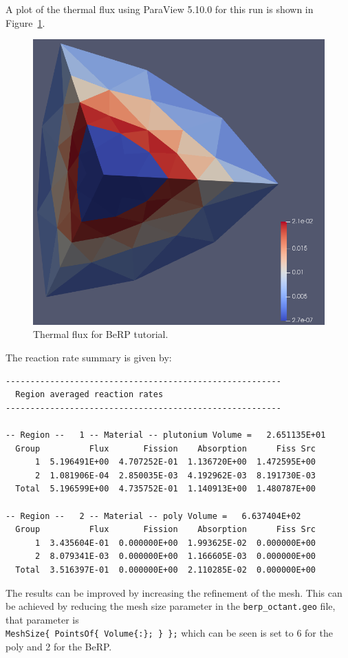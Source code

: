A plot of the thermal flux using ParaView 5.10.0 for this run is shown in Figure~\ref{fig:berp_thermal}.
\begin{figure}[th]
  \center
  \includegraphics[height=0.5\textwidth]{chapters/tutorials/figures/berp_thermal.png}
  \caption{Thermal flux for BeRP tutorial.}
  \label{fig:berp_thermal}
\end{figure}

The reaction rate summary is given by:
\begin{verbatim}
--------------------------------------------------------
  Region averaged reaction rates
--------------------------------------------------------

-- Region --   1 -- Material -- plutonium Volume =   2.651135E+01
  Group          Flux       Fission    Absorption      Fiss Src
      1  5.196491E+00  4.707252E-01  1.136720E+00  1.472595E+00
      2  1.081906E-04  2.850035E-03  4.192962E-03  8.191730E-03
  Total  5.196599E+00  4.735752E-01  1.140913E+00  1.480787E+00

-- Region --   2 -- Material -- poly Volume =   6.637404E+02
  Group          Flux       Fission    Absorption      Fiss Src
      1  3.435604E-01  0.000000E+00  1.993625E-02  0.000000E+00
      2  8.079341E-03  0.000000E+00  1.166605E-03  0.000000E+00
  Total  3.516397E-01  0.000000E+00  2.110285E-02  0.000000E+00
\end{verbatim}

The results can be improved by increasing the refinement of the mesh.
This can be achieved by reducing the mesh size parameter in the \verb"berp_octant.geo" file, that parameter is \\
\verb"MeshSize{ PointsOf{ Volume{:}; } };" which can be seen is set to 6 for the poly and 2 for the BeRP.